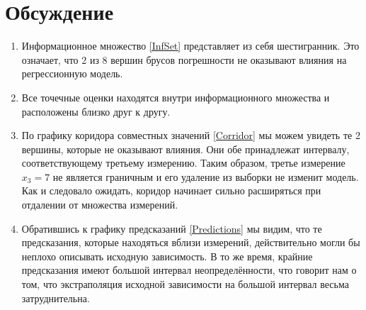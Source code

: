 \section{Обсуждение}
\begin{enumerate}
    \item Информационное множество \eqref{InfSet} представляет из себя шестигранник. Это означает, что  2 из 8 вершин брусов погрешности не оказывают влияния на регрессионную модель.
    \item Все точечные оценки находятся внутри информационного множества и расположены близко друг к другу.
    \item По графику коридора совместных значений \eqref{Corridor} мы можем увидеть те 2 вершины, которые не оказывают влияния. Они обе принадлежат интервалу, соответствующему третьему измерению. Таким образом, третье измерение $x_3=7$ не является граничным и его удаление из выборки не изменит модель. Как и следовало ожидать, коридор начинает сильно расширяться при отдалении от множества измерений.
    \item Обратившись к графику предсказаний \eqref{Predictions} мы видим, что те предсказания, которые находяться вблизи измерений, действительно могли бы неплохо описывать исходную зависимость. В то же время, крайние предсказания имеют большой интервал неопределённости, что говорит нам о том, что экстраполяция исходной зависимости на большой интервал весьма затруднительна.
\end{enumerate}